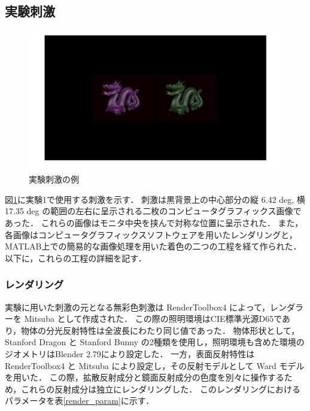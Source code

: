         \subsection{実験刺激}

            \begin{figure}[h]
                \centering
                \includegraphics[width=14.0cm]{./img/ex1_stimuli.png}
                \caption{実験刺激の例}
                \label{ex1_stimuli}
            \end{figure}

            図\ref{ex1_stimuli}に実験1で使用する刺激を示す．
            刺激は黒背景上の中心部分の縦 6.42 deg, 横 17.35 deg の範囲の左右に呈示される二枚のコンピュータグラフィックス画像であった．
            これらの画像はモニタ中央を挟んで対称な位置に呈示された．
            また，各画像はコンピュータグラフィックスソフトウェアを用いたレンダリングと，MATLAB上での簡易的な画像処理を用いた着色の二つの工程を経て作られた．
            以下に，これらの工程の詳細を記す．

            \subsubsection{レンダリング}

                実験に用いた刺激の元となる無彩色刺激は RenderToolbox4 によって，レンダラーを Mitsuba\cite{Mitsuba} として作成された．
                この際の照明環境はCIE標準光源D65であり，物体の分光反射特性は全波長にわたり同じ値であった．
                物体形状として，Stanford Dragon と Stanford Bunny \cite{StanfordModels} の2種類を使用し，照明環境も含めた環境のジオメトリはBlender 2.79により設定した．
                一方，表面反射特性は RenderToolbox4 と Mitsuba により設定し，その反射モデルとして Ward モデル\cite{Ward}を用いた．
                この際，拡散反射成分と鏡面反射成分の色度を別々に操作するため，これらの反射成分は独立にレンダリングした．
                このレンダリングにおけるパラメータを表\ref{render_param}に示す．

